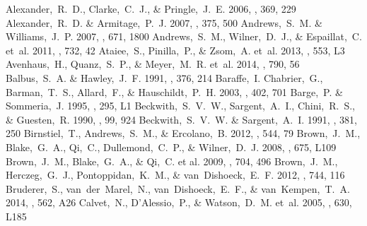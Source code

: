 \documentclass[apj]{emulateapj-rtx4}
\begin{document}
  \begin{thebibliography}{}
   Alexander,~R.~D., Clarke,~C.~J., \& Pringle,~J.~E. 2006, \mnras, 369, 229
   Alexander,~R.~D. \& Armitage,~P.~J. 2007, \mnras, 375, 500 
   Andrews,~S.~M. \& Williams,~J.~P. 2007, \apj, 671, 1800 
   Andrews,~S.~M., Wilner,~D.~J., \& Espaillat,~C. et~al. 2011, \apj, 732, 42 
   Ataiee,~S., Pinilla,~P., \& Zsom,~A. et~al. 2013, \aap, 553, L3 
   Avenhaus,~H., Quanz,~S.~P., \& Meyer,~M.~R. et~al. 2014, \apj, 790, 56
   Balbus,~S.~A. \& Hawley,~J.~F. 1991, \apj, 376, 214 
   Baraffe,~I. Chabrier,~G., Barman,~T.~S., Allard,~F., \& Hauschildt,~P.~H. 2003, \aap, 402, 701
   Barge,~P. \& Sommeria,~J. 1995, \aap, 295, L1 
   Beckwith,~S.~V.~W., Sargent,~A.~I., Chini,~R.~S., \& Guesten,~R. 1990, \aj, 99, 924 
   Beckwith,~S.~V.~W. \& Sargent,~A.~I. 1991, \apj, 381, 250 
   Birnstiel,~T., Andrews,~S.~M., \& Ercolano,~B. 2012, \aap, 544, 79
   Brown,~J.~M., Blake,~G.~A., Qi,~C., Dullemond,~C.~P., \& Wilner,~D.~J. 2008, \apj, 675, L109 
   Brown,~J.~M., Blake,~G.~A., \& Qi,~C. et al. 2009, \apj, 704, 496 
   Brown,~J.~M., Herczeg,~G.~J., Pontoppidan,~K.~M., \& van~Dishoeck,~E.~F. 2012, \apj, 744, 116 
   Bruderer,~S., van~der~Marel,~N., van~Dishoeck,~E.~F., \& van~Kempen,~T.~A. 2014, \aap, 562, A26 
   Calvet,~N., D'Alessio,~P., \& Watson,~D.~M. et~al. 2005, \apjl, 630, L185 

\end{thebibliography}
\end{document}

